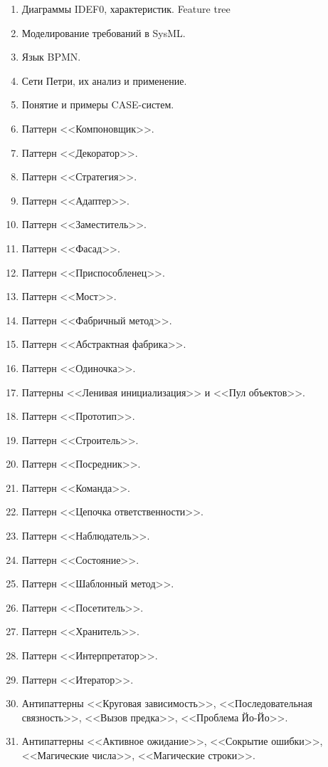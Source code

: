 \documentclass[a5paper]{article}
\begin{document}
\begin{enumerate}
    \item Диаграммы IDEF0, характеристик. Feature tree 
    \item Моделирование требований в SysML.
    \item Язык BPMN.
    \item Сети Петри, их анализ и применение.
    \item Понятие и примеры CASE-систем.
    \item Паттерн <<Компоновщик>>.
    \item Паттерн <<Декоратор>>.
    \item Паттерн <<Стратегия>>.
    \item Паттерн <<Адаптер>>.
    \item Паттерн <<Заместитель>>.
    \item Паттерн <<Фасад>>.
    \item Паттерн <<Приспособленец>>.
    \item Паттерн <<Мост>>.
    \item Паттерн <<Фабричный метод>>.
    \item Паттерн <<Абстрактная фабрика>>.
    \item Паттерн <<Одиночка>>.
    \item Паттерны <<Ленивая инициализация>> и <<Пул объектов>>.
    \item Паттерн <<Прототип>>.
    \item Паттерн <<Строитель>>.
    \item Паттерн <<Посредник>>.
    \item Паттерн <<Команда>>.
    \item Паттерн <<Цепочка ответственности>>.
    \item Паттерн <<Наблюдатель>>.
    \item Паттерн <<Состояние>>.
    \item Паттерн <<Шаблонный метод>>.
    \item Паттерн <<Посетитель>>.
    \item Паттерн <<Хранитель>>.
    \item Паттерн <<Интерпретатор>>.
    \item Паттерн <<Итератор>>.
    \item Антипаттерны <<Круговая зависимость>>, <<Последовательная связность>>, <<Вызов предка>>, <<Проблема Йо-Йо>>.
    \item Антипаттерны <<Активное ожидание>>, <<Сокрытие ошибки>>, <<Магические числа>>, <<Магические строки>>.

\end{enumerate}
\end{document}
